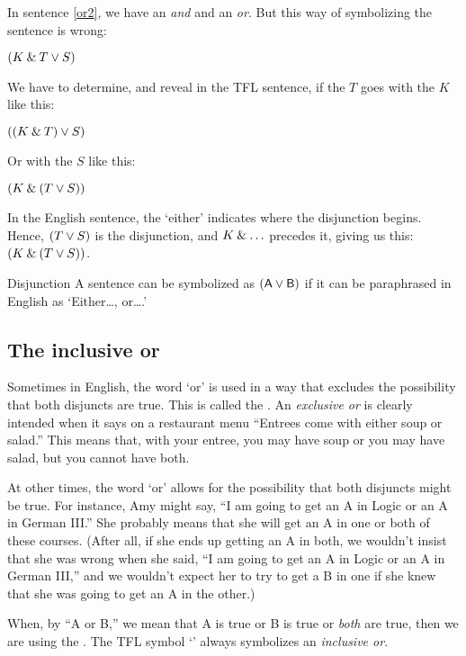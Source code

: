 In sentence \ref{or2}, we have an \textit{and} and an \textit{or}. But this way of symbolizing the sentence is wrong:
	\begin{earg}
		\item[] $(K \mathbin{\&} T \vee S)$ 
	\end{earg}
We have to determine, and reveal in the TFL sentence, if the $T$ goes with the $K$ like this:
	\begin{earg}
		\item[] $((K \mathbin{\&} T) \vee S)$ 
	\end{earg}
Or with the $S$ like this:
	\begin{earg}
		\item[] $(K \mathbin{\&} (T \vee S))$ 
	\end{earg}
In the English sentence, the `either' indicates where the disjunction begins. Hence, $(T \vee S)$ is the disjunction, and $K \mathbin{\&} \ldots$ precedes it, giving us this: $(K \mathbin{\&} (T \vee S))$.


\begin{factboxy}{Disjunction}
A sentence can be symbolized as $(\mathsf{A}\vee\mathsf{B})$ if it can be paraphrased in English as `Either\ldots, or\ldots.'
\end{factboxy}

\subsection{The inclusive or}\label{inclusive-or-1}

Sometimes in English, the word `or' is used in a way that excludes the possibility that both disjuncts are true. This is called the .  An \emph{exclusive or} is clearly intended when it says on a restaurant menu ``Entrees come with either soup or salad.'' This means that, with your entree, you may have soup or you may have salad, but you cannot have both.

At other times, the word `or' allows for the possibility that both disjuncts might be true. For instance, Amy might say, ``I am going to get an A in Logic or an A in German III.'' She probably means that she will get an A in one or both of these courses. (After all, if she ends up getting an A in both, we wouldn't insist that she was wrong when she said, ``I am going to get an A in Logic or an A in German III,'' and we wouldn't expect her to try to get a B in one if she knew that she was going to get an A in the other.)

When, by ``A or B,'' we mean that A is true or B is true or \textit{both} are true, then we are using the . The TFL symbol `\eor' always symbolizes an \emph{inclusive or}.

